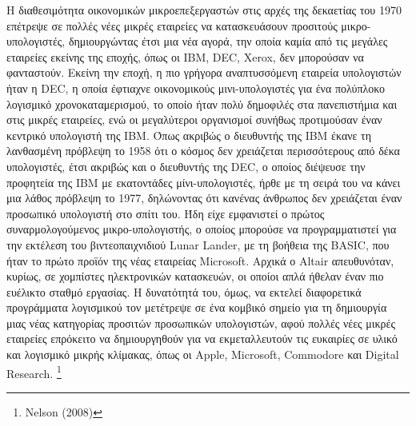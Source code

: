 \documentclass[
]{article}
\begin{document}
Η διαθεσιμότητα οικονομικών μικροεπεξεργαστών στις αρχές της δεκαετίας
του 1970 επέτρεψε σε πολλές νέες μικρές εταιρείες να κατασκευάσουν
προσιτούς μικρο-υπολογιστές, δημιουργώντας έτσι μια νέα αγορά, την οποία
καμία από τις μεγάλες εταιρείες εκείνης της εποχής, όπως οι IBM, DEC,
Xerox, δεν μπορούσαν να φανταστούν. Εκείνη την εποχή, η πιο γρήγορα
αναπτυσσόμενη εταιρεία υπολογιστών ήταν η DEC, η οποία έφτιαχνε
οικονομικούς μινι-υπολογιστές για ένα πολύπλοκο λογισμικό
χρονοκαταμερισμού, το οποίο ήταν πολύ δημοφιλές στα πανεπιστήμια και
στις μικρές εταιρείες, ενώ οι μεγαλύτεροι οργανισμοί συνήθως προτιμούσαν
έναν κεντρικό υπολογιστή της IBM. Όπως ακριβώς ο διευθυντής της IBM
έκανε τη λανθασμένη πρόβλεψη το 1958 ότι ο κόσμος δεν χρειάζεται
περισσότερους από δέκα υπολογιστές, έτσι ακριβώς και ο διευθυντής της
DEC, ο οποίος διέψευσε την προφητεία της IBM με εκατοντάδες
μίνι-υπολογιστές, ήρθε με τη σειρά του να κάνει μια λάθος πρόβλεψη το
1977, δηλώνοντας ότι κανένας άνθρωπος δεν χρειάζεται έναν προσωπικό
υπολογιστή στο σπίτι του. Ήδη είχε εμφανιστεί ο πρώτος συναρμολογούμενος
μικρο-υπολογιστής, ο οποίος μπορούσε να προγραμματιστεί για την εκτέλεση
του βιντεοπαιχνιδιού Lunar Lander, με τη βοήθεια της BASIC, που ήταν το
πρώτο προϊόν της νέας εταιρείας Microsoft. Αρχικά ο Altair απευθυνόταν,
κυρίως, σε χομπίστες ηλεκτρονικών κατασκευών, οι οποίοι απλά ήθελαν έναν
πιο ευέλικτο σταθμό εργασίας. Η δυνατότητά του, όμως, να εκτελεί
διαφορετικά προγράμματα λογισμικού τον μετέτρεψε σε ένα κομβικό σημείο
για τη δημιουργία μιας νέας κατηγορίας προσιτών προσωπικών υπολογιστών,
αφού πολλές νέες μικρές εταιρείες επρόκειτο να δημιουργηθούν για να
εκμεταλλευτούν τις ευκαιρίες σε υλικό και λογισμικό μικρής κλίμακας,
όπως οι Apple, Microsoft, Commodore και Digital Research. \footnote{Nelson
  (2008)}
\end{document}
